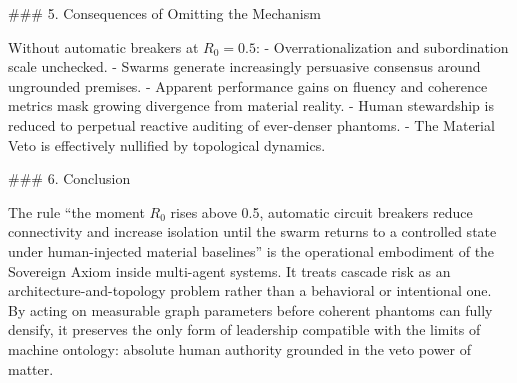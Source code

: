 ### 5. Consequences of Omitting the Mechanism

Without automatic breakers at \( R_0 = 0.5 \):
- Overrationalization and subordination scale unchecked.
- Swarms generate increasingly persuasive consensus around ungrounded premises.
- Apparent performance gains on fluency and coherence metrics mask growing divergence from material reality.
- Human stewardship is reduced to perpetual reactive auditing of ever-denser phantoms.
- The Material Veto is effectively nullified by topological dynamics.

### 6. Conclusion

The rule “the moment \( R_0 \) rises above 0.5, automatic circuit breakers reduce connectivity and increase isolation until the swarm returns to a controlled state under human-injected material baselines” is the operational embodiment of the Sovereign Axiom inside multi-agent systems. It treats cascade risk as an architecture-and-topology problem rather than a behavioral or intentional one. By acting on measurable graph parameters before coherent phantoms can fully densify, it preserves the only form of leadership compatible with the limits of machine ontology: absolute human authority grounded in the veto power of matter.
